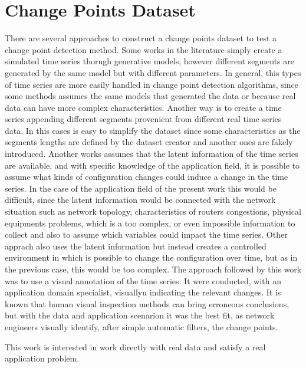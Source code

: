 
\section{Change Points Dataset}

There are several approaches to construct a change points dataset to test a change point detection method. Some works in the literature simply create a simulated time series thorugh generative models, however different segments are generated by the same model but with different parameters. In general, this types of time series are more easily handled in change point detection algorithms, since some methods assumes the same models that generated the data or because real data can have more complex characteristics. Another way is to create a time series appending different segments provenient from different real time series data. In this cases is easy to simplify the dataset since some characteristics as the segments lengths are defined by the dataset creator and another ones are fakely introduced. Another works assumes that the latent information of the time series are available, and with specific knowledge of the application field, it is possible to assume what kinds of configuration changes could induce a change in the time series. In the case of the application field of the present work this would be difficult, since the latent information would be connected with the network situation such as network topology, characteristics of routers congestions, physical equipments problems, which is a too complex, or even impossible information to collect and also to assume which variables could impact the time series. Other apprach also uses the latent information but instead creates a controlled environment in which is possible to change the configuration over time, but as in the previous case, this would be too complex. The approach followed by this work was to use a visual annotation of the time series. It were conducted, with an application domain specialist, visuallyu indicating the relevant changes. It is known that human visual inspection methods can bring erroneous conclusions, but with the data and application scenarion it was the best fit, as network engineers visually identify, after simple automatic filters, the change points.

This work is interested in work directly with real data and satisfy a real application problem.

